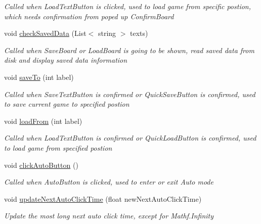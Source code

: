 \begin{DoxyCompactItemize}
\begin{DoxyCompactList}\small\item\em Called when Load\+Text\+Button is clicked, used to load game from specific postion, which needs confirmation from poped up Confirm\+Board \end{DoxyCompactList}\item 
void \hyperlink{classdoki_unity_1_1_world_control_a22997355be4716d79773434108fb43ed}{check\+Saved\+Data} (List$<$ string $>$ texts)
\begin{DoxyCompactList}\small\item\em Called when Save\+Board or Load\+Board is going to be shown, read saved data from disk and display saved data information \end{DoxyCompactList}\item 
void \hyperlink{classdoki_unity_1_1_world_control_a9d7c2602d61ad91fa4dd3f153a80ca08}{save\+To} (int label)
\begin{DoxyCompactList}\small\item\em Called when Save\+Text\+Button is confirmed or Quick\+Save\+Button is confirmed, used to save current game to specified postion \end{DoxyCompactList}\item 
void \hyperlink{classdoki_unity_1_1_world_control_adf111cd1b291659b688eb5a853d79332}{load\+From} (int label)
\begin{DoxyCompactList}\small\item\em Called when Load\+Text\+Button is confirmed or Quick\+Load\+Button is confirmed, used to load game from specified postion \end{DoxyCompactList}\item 
void \hyperlink{classdoki_unity_1_1_world_control_a722bd30c844f00bd02a9ad566b2d4090}{click\+Auto\+Button} ()
\begin{DoxyCompactList}\small\item\em Called when Auto\+Button is clicked, used to enter or exit Auto mode \end{DoxyCompactList}\item 
void \hyperlink{classdoki_unity_1_1_world_control_afb4876dc4a7415bcab16e156d6a0784c}{update\+Next\+Auto\+Click\+Time} (float new\+Next\+Auto\+Click\+Time)
\begin{DoxyCompactList}\small\item\em Update the most long next auto click time, except for Mathf.\+Infinity \end{DoxyCompactList}\item 

\end{DoxyCompactItemize}
